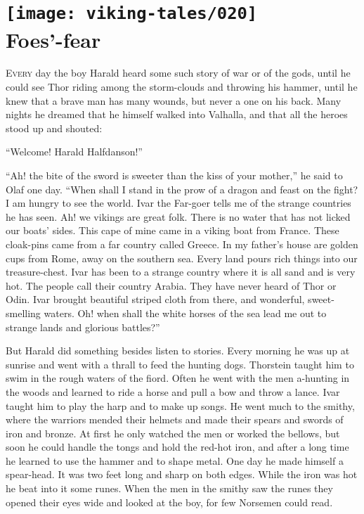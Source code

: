 \section[Foes'-fear]{
    \texttt{[image: viking-tales/020]}\\
    Foes'-fear}

\lettrine{E}{very} day the boy Harald heard some such story of war or of
the gods, until he could see Thor riding among the storm-clouds and
throwing his hammer, until he knew that a brave man has many wounds, but
never a one on his back. Many nights he dreamed that he himself walked
into Valhalla, and that all the heroes stood up and shouted:

``Welcome! Harald Halfdanson!''

``Ah! the bite of the sword is sweeter than the kiss of your mother,''
he said to Olaf one day. ``When shall I stand in the prow of a dragon
and feast on the fight? I am hungry to see the world. Ivar the Far-goer
tells me of the strange countries he has seen. Ah! we vikings are great
folk. There is no water that has not licked our boats' sides. This cape
of mine came in a viking boat from France. These cloak-pins came from a
far country called Greece. In my father's house are golden cups from
Rome, away on the southern sea. Every land pours rich things into our
treasure-chest. Ivar has been to a strange country where it is all sand
and is very hot. The people call their country Arabia. They have never
heard of Thor or Odin. Ivar brought beautiful striped cloth from there,
and wonderful, sweet-smelling waters. Oh! when shall the white horses of
the sea lead me out to strange lands and glorious battles?''

But Harald did something besides listen to stories. Every morning he was
up at sunrise and went with a thrall to feed the hunting dogs. Thorstein
taught him to swim in the rough waters of the fiord. Often he went with
the men a-hunting in the woods and learned to ride a horse and pull a
bow and throw a lance. Ivar taught him to play the harp and to make up
songs. He went much to the smithy, where the warriors mended their
helmets and made their spears and swords of iron and bronze. At first he
only watched the men or worked the bellows, but soon he could handle the
tongs and hold the red-hot iron, and after a long time he learned to use
the hammer and to shape metal. One day he made himself a spear-head. It
was two feet long and sharp on both edges. While the iron was hot he
beat into it some runes. When the men in the smithy saw the runes they
opened their eyes wide and looked at the boy, for few Norsemen could
read.

